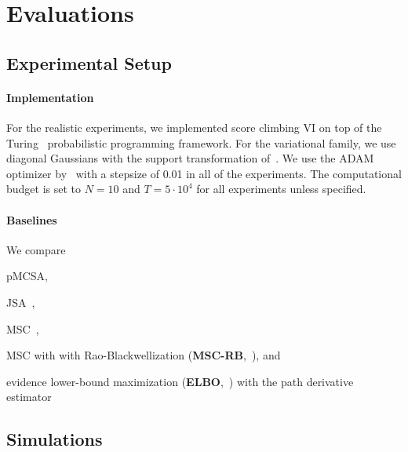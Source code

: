 \vspace{-0.05in}
\section{Evaluations}\label{section:eval}
\vspace{-0.05in}
\subsection{Experimental Setup}
\vspace{-0.05in}
\paragraph{Implementation}
For the realistic experiments, we implemented score climbing VI on top of the Turing~\citep{ge2018t} probabilistic programming framework.
For the variational family, we use diagonal Gaussians with the support transformation of~\citet{JMLR:v18:16-107}.
We use the ADAM optimizer by~\citet{kingma_adam_2015} with a stepsize of 0.01 in all of the experiments.
The computational budget is set to \(N=10\) and \(T=5\cdot10^4\) for all experiments unless specified.

\vspace{-0.1in}
\paragraph{Baselines}
We compare
\begin{enumerate*}[label=\textbf{(\roman*)}]
  \item pMCSA,
  \item JSA~\citep{pmlr-v124-ou20a},
  \item MSC~\citep{NEURIPS2020_b2070693},
  \item MSC with with Rao-Blackwellization (\textbf{MSC-RB},~\citealt{NEURIPS2020_b2070693}), and
  \item evidence lower-bound maximization (\textbf{ELBO},~\citealt{pmlr-v33-ranganath14, JMLR:v18:16-107}) with the path derivative estimator~\citep{NIPS2017_e91068ff}
\end{enumerate*}

\vspace{-0.1in}
\subsection{Simulations}\label{section:simulation}
\vspace{-0.05in}
